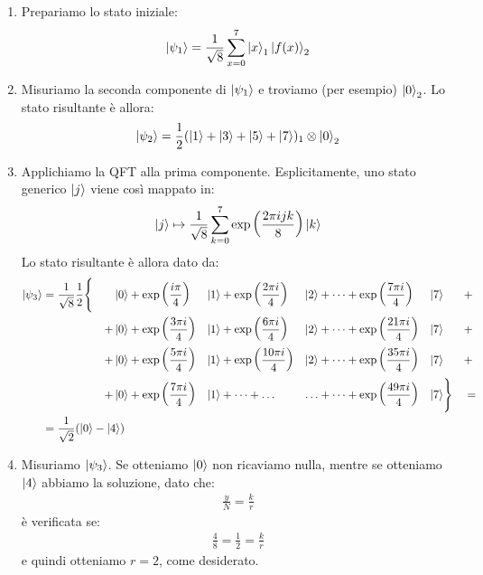 \documentclass[../../InformazioneQuantistica.tex]{subfiles}
\begin{document}
\begin{enumerate}
\item Prepariamo lo stato iniziale:
\begin{align*}
\Ket{\psi_1} = \frac{1}{\sqrt{8}} \sum_{x=0}^7 \Ket{x}_1 \Ket{f(x)}_2
\end{align*}
\item Misuriamo la seconda componente di $\Ket{\psi_1}$ e troviamo (per esempio) $\Ket{0}_2$. Lo stato risultante è allora:
\begin{align*}
\Ket{\psi_2} = \frac{1}{2}(\Ket{1} + \Ket{3} + \Ket{5} + \Ket{7} )_1 \otimes \Ket{0}_2 
\end{align*}
\item Applichiamo la QFT alla prima componente. Esplicitamente, uno stato generico $\Ket{j}$ viene così mappato in:
\begin{align*}
\Ket{j} \mapsto \frac{1}{\sqrt{8}} \sum_{k=0}^7 \exp\left(\frac{2\pi i jk}{8}\right) \Ket{k}
\end{align*}
Lo stato risultante è allora dato da:
\begin{alignat*}{6}
\ket{\psi_3} &= \frac{1}{\sqrt{8}} \frac{1}{2}\Bigg \{ &&\ket{0} + \exp\left(\frac{i\pi}{4}\right) &\ket{1}& + \exp\left(\frac{2\pi i}{4}\right) &\ket{2}& + \dots + \exp\left(\frac{7\pi i}{4}\right) &\ket{7}& &&+\\
&   &+&\ket{0} + \exp\left(\frac{3\pi i}{4}\right) &\ket{1}& + \exp\left(\frac{6\pi i}{4}\right) &\ket{2}& + \dots + \exp\left(\frac{21 \pi i}{4}\right)&\ket{7}& &&+\\
&  &+&\ket{0} + \exp\left(\frac{5\pi i}{4}\right) &\ket{1}& + \exp\left(\frac{10\pi i}{4}\right) &\ket{2}& + \dots + \exp\left(\frac{35 \pi i}{4}\right) &\ket{7}& &&+\\
&  &+&\ket{0} + \exp\left(\frac{7\pi i}{4}\right) &\ket{1}& + \dots  +\dots  &\dots& + \dots + \exp\left(\frac{49\pi i}{4}\right) &\ket{7}&\Bigg \} &&=\\
&= \frac{1}{\sqrt{2}} (\ket{0}-\ket{4}) \span\span\span\span\span
\end{alignat*}
\item Misuriamo $\Ket{\psi_3}$. Se otteniamo $\Ket{0}$ non ricaviamo nulla, mentre se otteniamo $\Ket{4}$ abbiamo la soluzione, dato che:
\begin{align*}
\frac{y}{N} = \frac{k}{r}
\end{align*}
è verificata se:
\begin{align*}
\frac{4}{8} = \frac{1}{2} = \frac{k}{r}
\end{align*}
e quindi otteniamo $r=2$, come desiderato.
\end{enumerate}
\end{document}
